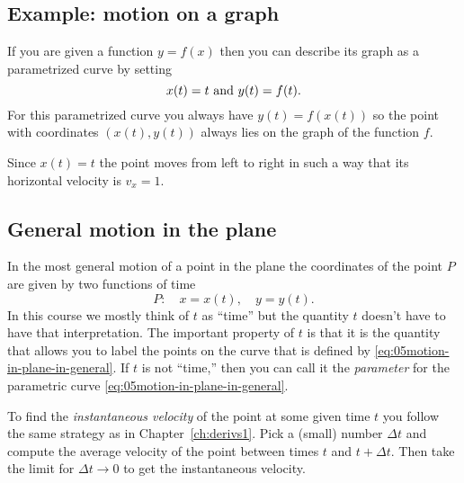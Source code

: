 \subsection{Example: motion on a graph}
\label{sec:motion-on-a-graph}
\hangindent-170pt\noindent%
If you are given a function $y=f(x)$ then you can describe its graph as a
parametrized curve by setting
\[\displaywidth180pt
  x(t) = t \text{ and }y(t)= f(t).
\]
For this parametrized curve you always have $y(t) = f(x(t))$ so the point with
coordinates $(x(t), y(t))$ always lies on the graph of the function $f$.
\centerline{ }

Since $x(t) = t$ the point moves from left to right in such a way that its
horizontal velocity is $v_x=1$.

\subsection{General motion in the plane}
In the most general motion of a point in the plane the coordinates of the point
$P$ are given by two functions of time
\begin{equation}
  P:\quad x = x(t), \quad y = y(t).
  \label{eq:05motion-in-plane-in-general}
\end{equation}
In this course we mostly think of $t$ as ``time'' but the quantity $t$ doesn't
have to have that interpretation.  The important property of $t$ is that it is
the quantity that allows you to label the points on the curve that is defined by
\eqref{eq:05motion-in-plane-in-general}.  If $t$ is not ``time,'' then you can
call it the \emph{parameter} for the parametric curve
\eqref{eq:05motion-in-plane-in-general}.

To find the \emph{instantaneous velocity} of the point at some given time $t$
you follow the same strategy as in Chapter~\ref{ch:derivs1}.  Pick a (small)
number $\Delta t$ and compute the average velocity of the point between times
$t$ and $t+\Delta t$.  Then take the limit for $\Delta t\to 0$ to get the
instantaneous velocity.

